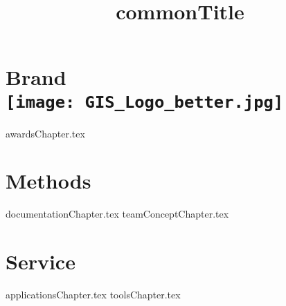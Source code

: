 \documentclass[twoside, 12pt]{memoir}  %
\title{ {commonTitle}}  %
\begin{document}
%
%
\pagestyle{empty} %
%
\frontmatter %
%
\maketitle %
%
\clearpage
%
%
\tableofcontents %
%
\clearpage
%
\mainmatter %
%
%
%
\pagestyle{fancy} %
%
%
\part[Brand]{Brand\\{\texttt{[image: GIS\_Logo\_better.jpg]}}}
%
%
{awardsChapter.tex}
%
%
\part{Methods}
%
%
{documentationChapter.tex}
%
{teamConceptChapter.tex}
%
%
\part{Service}
%
%
{applicationsChapter.tex}
%
{toolsChapter.tex}
%
%
\end{document}

